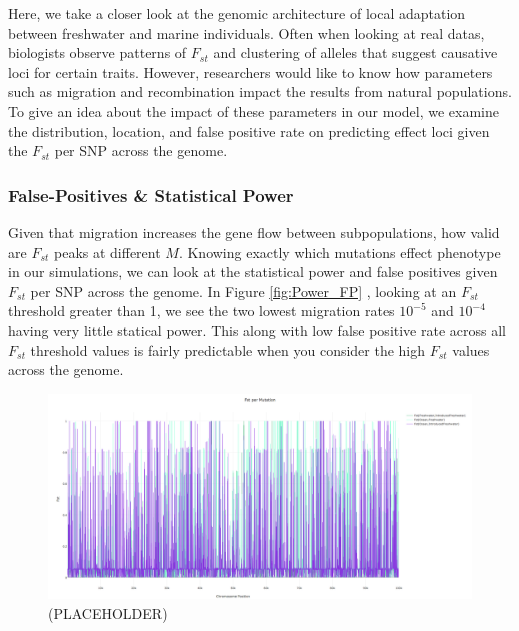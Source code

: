 \documentclass{article}
\begin{document}
Here, we take a closer look at the genomic architecture of local adaptation between freshwater and marine individuals. 
Often when looking at real datas, biologists observe patterns of $F_{st}$ and clustering of alleles that suggest causative loci for certain traits.
However, researchers would like to know how parameters such as migration and recombination impact the results from natural populations.
To give an idea about the impact of these parameters in our model, we examine the distribution, location, and false positive rate on predicting effect loci
given the $F_{st}$ per SNP across the genome. 


\subsubsection*{False-Positives \& Statistical Power}

Given that migration increases the gene flow between subpopulations, how valid are $F_{st}$ peaks at different $M$. 
Knowing exactly which mutations effect phenotype in our simulations, 
we can look at the statistical power and false positives given $F_{st}$ per SNP across the genome. 
In Figure \ref{fig:Power_FP} , looking at an $F_{st}$ threshold greater than 1, we see the two lowest migration rates $10^{-5}$ and $10^{-4}$ having very little statical power. 
This along with low false positive rate across all $F_{st}$ threshold values is fairly predictable when you consider the high $F_{st}$ values across the genome. 







\begin{figure}[h!tb]
	\begin{center}
  		\includegraphics[width=0.7\linewidth]{plotlyPlots/FstAcross5e-5.png}
  		\caption{ (PLACEHOLDER)
		}
  		\label{fig:Fst1}
	\end{center}
\end{figure}
\end{document}
